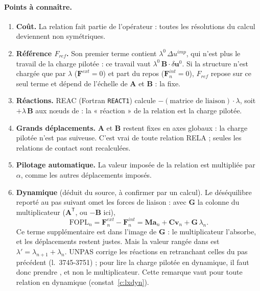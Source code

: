 \documentclass[11pt,a4paper]{article}
\numberwithin{equation}{section}
\newcommand{\src}[1]{\texttt{\detokenize{#1}}}          %
\newcommand{\pr}[1]{\textsf{#1}}                        %
\newcommand{\op}[1]{\textsf{\small #1}}                 %
\newcommand{\lig}[1]{l.~#1}
\newcommand{\vc}[1]{\symbf{#1}}                         %
\begin{document}
\paragraph{Points à connaître.}
\begin{enumerate}
\item \textbf{Coût.} La relation fait partie de l'opérateur : toutes les résolutions du calcul deviennent non symétriques.
\item \textbf{Référence $F_{ref}$.} Son premier terme contient $\lambda^{0}\,\Delta u^{imp}$, qui n'est plus le travail de la charge pilotée : ce travail vaut $\lambda^{0}\,\vc B\cdot\delta\vc u^{0}$. Si la structure n'est chargée que par $\lambda$ ($\vc F^{ext} = 0$) et part du repos ($\vc F^{int}_n = 0$), $F_{ref}$ repose sur ce seul terme et dépend de l'échelle de $\vc A$ et $\vc B$ : \src{NORM} la fixe.
\item \textbf{Réactions.} \op{REAC} (Fortran \texttt{REACT1}) calcule $-(\text{matrice de liaison})\cdot\lambda$, soit $+\lambda\,\vc B$ aux nœuds de \src{CHP2} : la « réaction » de la relation est la charge pilotée.
\item \textbf{Grands déplacements.} $\vc A$ et $\vc B$ restent fixes en axes globaux : la charge pilotée n'est pas suiveuse. C'est vrai de toute relation \op{RELA} ; seules les relations de contact sont recalculées.
\item \textbf{Pilotage automatique.} La valeur imposée de la relation est multipliée par $\alpha$, comme les autres déplacements imposés.
\item \textbf{Dynamique} (déduit du source, à confirmer par un calcul). Le déséquilibre reporté au pas suivant omet les forces de liaison : avec $\vc G$ la colonne du multiplicateur ($\vc A^{\mathsf T}$, ou $-\vc B$ ici),
\begin{equation}
\mathrm{FOPL}_n = \vc F^{ext}_n - \vc F^{int}_n = \vc M\vc a_n + \vc C\vc v_n + \vc G\,\lambda_n .
\end{equation}
Ce terme supplémentaire est dans l'image de $\vc G$ : le multiplicateur l'absorbe, et les déplacements restent justes. Mais la valeur rangée dans \src{DEPLACEMENTS} est $\lambda' = \lambda_{n+1} + \lambda_n$. \pr{UNPAS} corrige les réactions en retranchant celles du pas précédent (\lig{3745-3751}) ; pour lire la charge pilotée en dynamique, il faut donc prendre \src{REACTIONS}, et non le multiplicateur. Cette remarque vaut pour toute relation en dynamique (constat~\ref{c:lxdyn}).
\end{enumerate}
\end{document}
